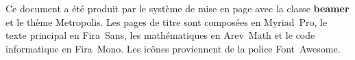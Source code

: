 \begin{frame}[plain]
  \begin{adjustwidth}{20mm}{20mm}
    \scriptsize \raggedright %
    Ce document a été produit par le système de mise en page
    {\XeLaTeX} avec la classe \textbf{beamer} et le thème Metropolis.
    Les pages de titre sont composées en Myriad~Pro, le texte
    principal en Fira~Sans, les mathématiques en Arev~Math et le code
    informatique en Fira~Mono. Les icônes proviennent de la police
    Font~Awesome.
  \end{adjustwidth}
\end{frame}

